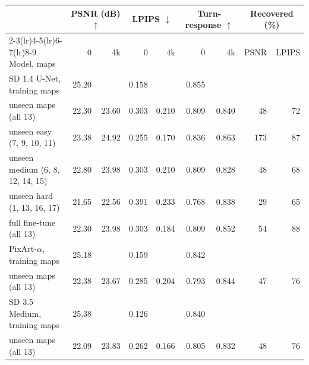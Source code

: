 \begin{tabular}{lrrrrrrrr}
\toprule
& \multicolumn{2}{c}{PSNR (dB) $\uparrow$} & \multicolumn{2}{c}{LPIPS $\downarrow$} & \multicolumn{2}{c}{Turn-response $\uparrow$} & \multicolumn{2}{c}{Recovered (\%)} \\
\cmidrule(lr){2-3}\cmidrule(lr){4-5}\cmidrule(lr){6-7}\cmidrule(lr){8-9}
Model, maps & 0 & 4k & 0 & 4k & 0 & 4k & PSNR & LPIPS \\
\midrule
SD 1.4 U-Net, training maps & 25.20 &  & 0.158 &  & 0.855 &  &  &  \\
unseen maps (all 13) & 22.30 & 23.60 & 0.303 & 0.210 & 0.809 & 0.840 & 48 & 72 \\
unseen easy (7, 9, 10, 11) & 23.38 & 24.92 & 0.255 & 0.170 & 0.836 & 0.863 & 173 & 87 \\
unseen medium (6, 8, 12, 14, 15) & 22.80 & 23.98 & 0.303 & 0.210 & 0.809 & 0.828 & 48 & 68 \\
unseen hard (1, 13, 16, 17) & 21.65 & 22.56 & 0.391 & 0.233 & 0.768 & 0.838 & 29 & 65 \\
full fine-tune (all 13) & 22.30 & 23.98 & 0.303 & 0.184 & 0.809 & 0.852 & 54 & 88 \\
\midrule
PixArt-$\alpha$, training maps & 25.18 &  & 0.159 &  & 0.842 &  &  &  \\
unseen maps (all 13) & 22.38 & 23.67 & 0.285 & 0.204 & 0.793 & 0.844 & 47 & 76 \\
\midrule
SD 3.5 Medium, training maps & 25.38 &  & 0.126 &  & 0.840 &  &  &  \\
unseen maps (all 13) & 22.09 & 23.83 & 0.262 & 0.166 & 0.805 & 0.832 & 48 & 76 \\
\bottomrule
\end{tabular}
